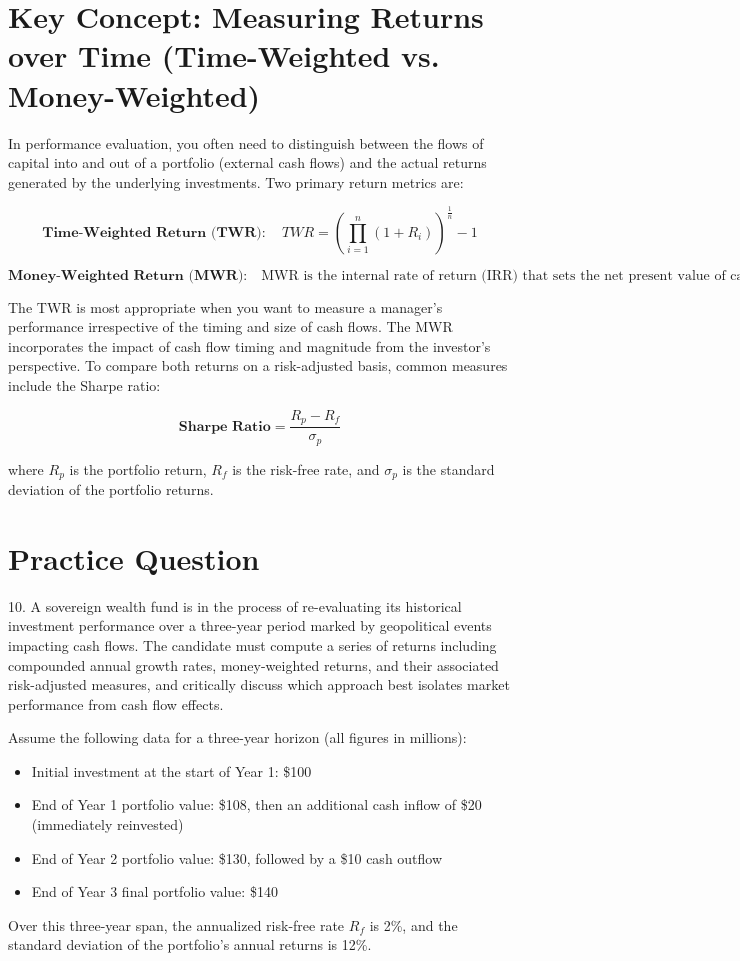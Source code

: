 \section*{Key Concept: Measuring Returns over Time (Time-Weighted vs. Money-Weighted)}

In performance evaluation, you often need to distinguish between the flows of capital into and out of a portfolio (external cash flows) and the actual returns generated by the underlying investments. Two primary return metrics are:

\[
\textbf{Time-Weighted Return (TWR)}: \quad TWR = \left(\prod_{i=1}^{n} (1 + R_i)\right)^{\frac{1}{n}} - 1
\]

\[
\textbf{Money-Weighted Return (MWR)}: \quad \text{MWR} \text{ is the internal rate of return (IRR) that sets the net present value of cash flows to zero.}
\]

The TWR is most appropriate when you want to measure a manager's performance irrespective of the timing and size of cash flows. The MWR incorporates the impact of cash flow timing and magnitude from the investor's perspective. To compare both returns on a risk-adjusted basis, common measures include the Sharpe ratio:

\[
\textbf{Sharpe Ratio} = \frac{R_p - R_f}{\sigma_p}
\]

where \(R_p\) is the portfolio return, \(R_f\) is the risk-free rate, and \(\sigma_p\) is the standard deviation of the portfolio returns.

\section*{Practice Question}
10. A sovereign wealth fund is in the process of re-evaluating its historical investment performance over a three-year period marked by geopolitical events impacting cash flows. The candidate must compute a series of returns including compounded annual growth rates, money-weighted returns, and their associated risk-adjusted measures, and critically discuss which approach best isolates market performance from cash flow effects.

Assume the following data for a three-year horizon (all figures in millions):
\begin{itemize}
\item Initial investment at the start of Year 1: \$100
\item End of Year 1 portfolio value: \$108, then an additional cash inflow of \$20 (immediately reinvested)
\item End of Year 2 portfolio value: \$130, followed by a \$10 cash outflow
\item End of Year 3 final portfolio value: \$140
\end{itemize}
Over this three-year span, the annualized risk-free rate \(R_f\) is 2\%, and the standard deviation of the portfolio's annual returns is 12\%.

